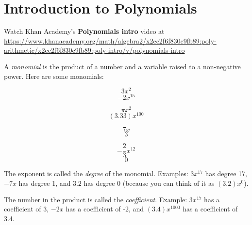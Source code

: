 \chapter{Introduction to Polynomials}

Watch Khan Academy's \textbf{Polynomials intro} video at \url{https://www.khanacademy.org/math/algebra2/x2ec2f6f830c9fb89:poly-arithmetic/x2ec2f6f830c9fb89:poly-intro/v/polynomials-intro}

A \emph{monomial} is the product of a number and a variable raised to a non-negative power. Here are some monomials:
\begin{multicols}{4}
  \begin{equation*}
    3 x^2
  \end{equation*}
  \begin{equation*}
    -2 x^{15}
  \end{equation*}

  \begin{equation*}
    \pi x^2
  \end{equation*}
  \begin{equation*}
    (3.33)x^{100}
  \end{equation*}

  \begin{equation*}
    7x
  \end{equation*}
  \begin{equation*}
    3
  \end{equation*}

  \begin{equation*}
    -\frac{2}{3}x^{12}
  \end{equation*}
  \begin{equation*}
    0
  \end{equation*}

  
\end{multicols}

The exponent is called the \emph{degree} of the monomial. Examples: $3x^{17}$
has degree 17, $-7x$ has degree 1, and $3.2$ has degree 0 (because you can think of it as $(3.2)x^0$).

The number in the product is called the \emph{coefficient}.  Example: $3x^{17}$ has a coefficient of 3, $-2x$ has a coefficient of -2, and $(3.4)x^{1000}$ has a coefficient of 3.4.

